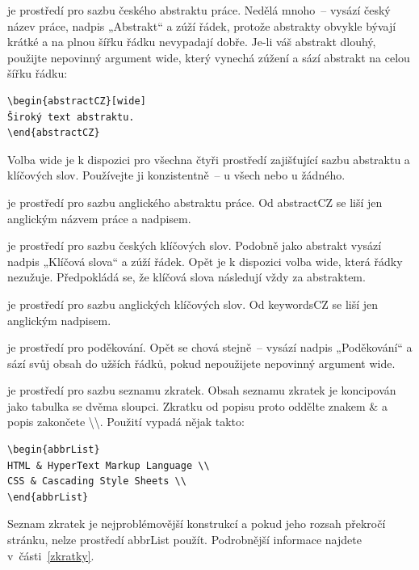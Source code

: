 \documentclass[FZS,DP,EN]{tulthesis}
\newcommand{\argument}[1]{{\ttfamily\color{\tulcolor}#1}}
\newcommand{\argumentindex}[1]{\argument{#1}\index{#1}}
\newcommand{\prostredi}[1]{\argumentindex{#1}}
\newenvironment{myquote}{\begin{list}{}{\setlength\leftmargin\parindent}\item[]}{\end{list}}
\newenvironment{listing}{\begin{myquote}\color{\tulcolor}}{\end{myquote}}
\begin{document}
\begin{description}
\item[\prostredi{abstractCZ}] je prostředí pro sazbu českého abstraktu práce.
Nedělá mnoho~-- vysází český název práce, nadpis „Abstrakt“ a zúží řádek,
protože abstrakty obvykle bývají krátké a na plnou šířku řádku nevypadají
dobře. Je-li váš abstrakt dlouhý, použijte nepovinný argument \argument{wide},
který vynechá zúžení a sází abstrakt na celou šířku řádku:

\begin{listing}
\begin{verbatim}
\begin{abstractCZ}[wide]
Široký text abstraktu.
\end{abstractCZ}
\end{verbatim}
\end{listing}

Volba \argument{wide} je k dispozici pro všechna čtyři prostředí zajišťující
sazbu abstraktu a klíčových slov. Používejte ji konzistentně~-- u všech nebo u
žádného.

\item[\prostredi{abstractEN}] je prostředí pro sazbu anglického abstraktu práce.
Od \argument{abstractCZ} se liší jen anglickým názvem práce a nadpisem.

\item[\prostredi{keywordsCZ}] je prostředí pro sazbu českých klíčových slov.
Podobně jako abstrakt vysází nadpis „Klíčová slova“ a zúží řádek. Opět je k
dispozici volba \argument{wide}, která řádky nezužuje. Předpokládá se, že
klíčová slova následují vždy za abstraktem.

\item[\prostredi{keywordsEN}] je prostředí pro sazbu anglických klíčových slov.
Od \argument{keywordsCZ} se liší jen anglickým nadpisem.

\item[\prostredi{acknowledgement}] je prostředí pro poděkování. Opět se chová
stejně~-- vysází nadpis „Poděkování“ a sází svůj obsah do užších řádků, pokud
nepoužijete nepovinný argument \argument{wide}.

\item[\prostredi{abbrList}] je prostředí pro sazbu seznamu zkratek. Obsah
seznamu zkratek je koncipován jako tabulka se dvěma sloupci. Zkratku od popisu
proto oddělte znakem \argument{\&} a popis zakončete
\argument{\textbackslash\textbackslash}. Použití vypadá nějak takto:

{\color{\tulcolor}
\begin{verbatim}
\begin{abbrList}
HTML & HyperText Markup Language \\
CSS & Cascading Style Sheets \\
\end{abbrList}
\end{verbatim}}

Seznam zkratek je nejproblémovější konstrukcí a pokud jeho rozsah překročí
stránku, nelze prostředí \argument{abbrList} použít. Podrobnější informace
najdete v~části~\ref{zkratky}.

\end{description}
\end{document}
